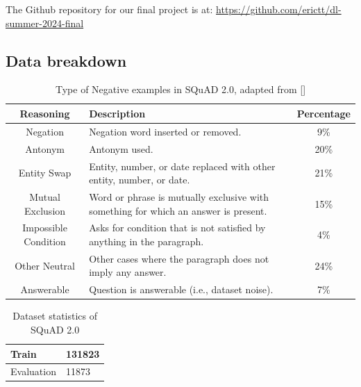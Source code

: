\documentclass[conference]{IEEEtran}
\begin{document}
The Github repository for our ﬁnal project is at: \url{https://github.com/erictt/dl-summer-2024-final}

\subsection{Data breakdown}

\begin{table}[h]
    \centering
    \caption{Type of Negative examples in SQuAD 2.0, adapted from [\cite{b15}]}
    \label{tab:t3}
    \begin{tabular}{|c|p{4cm}|c|}
        \hline
        Reasoning & Description & Percentage \\
        \hline
        Negation & Negation word inserted or removed. & 9\% \\
        \hline
        Antonym & Antonym used. & 20\% \\
        \hline
        Entity Swap & Entity, number, or date replaced with other entity, number, or date. & 21\% \\
        \hline
        Mutual Exclusion & Word or phrase is mutually exclusive with something for which an answer is present. & 15\% \\
        \hline
        Impossible Condition & Asks for condition that is not satisfied by anything in the paragraph. & 4\% \\
        \hline
        Other Neutral & Other cases where the paragraph does not imply any answer. & 24\% \\
        \hline
        Answerable & Question is answerable (i.e., dataset noise). & 7\% \\
        \hline
    \end{tabular}
\end{table}

\begin{table}[h]
    \centering
\caption{Dataset statistics of SQuAD 2.0 \cite{b15}}
\label{tab:t4}
    \begin{tabular}{|p{2cm}|p{2cm}|} \hline
        Train& 131823\\ \hline
        Evaluation& 11873\\\hline
    \end{tabular}
\end{table}
\end{document}

